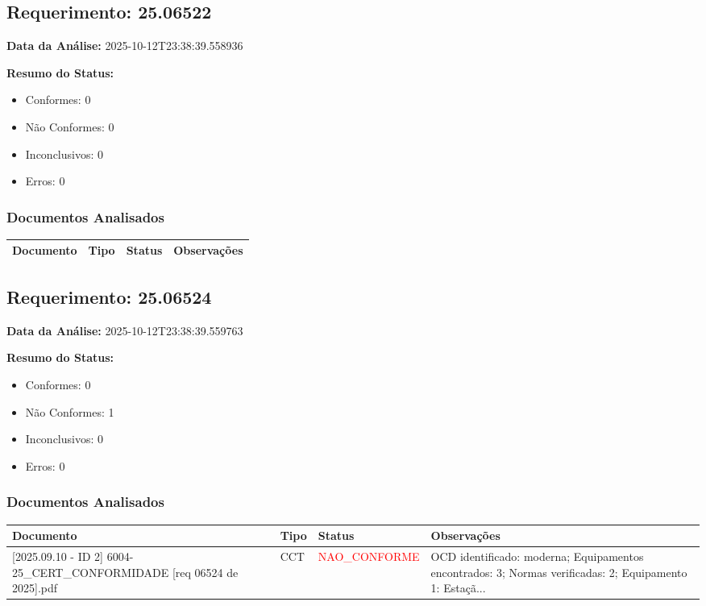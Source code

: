 \documentclass[12pt,a4paper]{article}
\begin{document}
\subsection{Requerimento: 25.06522}

\textbf{Data da Análise:} 2025-10-12T23:38:39.558936

\textbf{Resumo do Status:}
\begin{itemize}
    \item Conformes: 0
    \item Não Conformes: 0
    \item Inconclusivos: 0
    \item Erros: 0
\end{itemize}

\subsubsection{Documentos Analisados}

\begin{longtable}{|p{4cm}|p{2cm}|p{2cm}|p{6cm}|}
\hline
\textbf{Documento} & \textbf{Tipo} & \textbf{Status} & \textbf{Observações} \\
\hline
\endhead
\end{longtable}


\subsection{Requerimento: 25.06524}

\textbf{Data da Análise:} 2025-10-12T23:38:39.559763

\textbf{Resumo do Status:}
\begin{itemize}
    \item Conformes: 0
    \item Não Conformes: 1
    \item Inconclusivos: 0
    \item Erros: 0
\end{itemize}

\subsubsection{Documentos Analisados}

\begin{longtable}{|p{4cm}|p{2cm}|p{2cm}|p{6cm}|}
\hline
\textbf{Documento} & \textbf{Tipo} & \textbf{Status} & \textbf{Observações} \\
\hline
\endhead
[Certificado de Conformidade Técnica - CCT][2025.09.10 - ID 2] 6004-25\_CERT\_CONFORMIDADE [req 06524 de 2025].pdf & CCT & \textcolor{red}{NAO\_CONFORME} & OCD identificado: moderna; Equipamentos encontrados: 3; Normas verificadas: 2; Equipamento 1: Estaçã... \\
\hline
\end{longtable}
\end{document}
